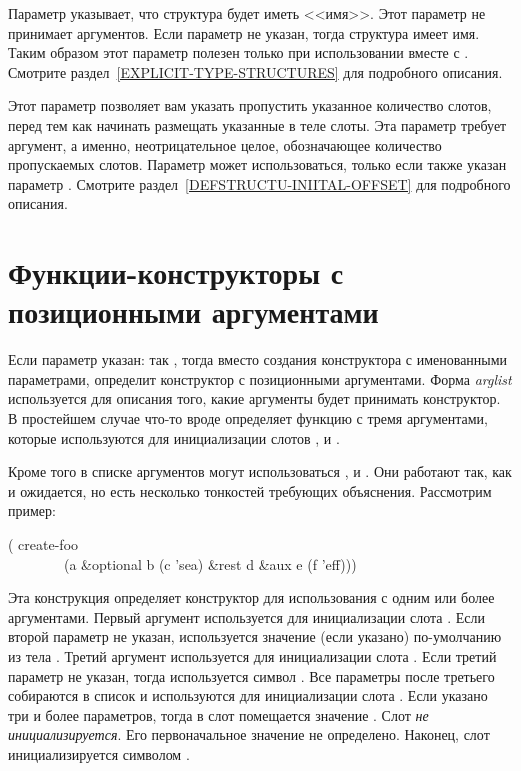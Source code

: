 \begin{flushdesc}
\item[\cd{:named}] Параметр  указывает, что структура будет иметь
  <<имя>>. Этот параметр не принимает аргументов. Если параметр  не
  указан, тогда структура имеет имя. Таким образом этот параметр полезен только
  при использовании вместе с .  Смотрите
  раздел~\ref{EXPLICIT-TYPE-STRUCTURES} для подробного описания.

\item[\cd{:initial-offset}] Этот параметр позволяет вам указать 
  пропустить указанное количество слотов, перед тем как начинать размещать
  указанные в теле слоты. Эта параметр требует аргумент, а именно,
  неотрицательное целое, обозначающее количество пропускаемых слотов. Параметр
   может использоваться, только если также указан параметр
  .  Смотрите раздел~\ref{DEFSTRUCTU-INIITAL-OFFSET} для подробного
  описания.
\end{flushdesc}

\section{Функции-конструкторы с позиционными аргументами}
\label{DEFSTRUCT-CONSTRUCTOR-SYNTAX}

Если параметр  указан: так , тогда вместо создания конструктора с именованными
параметрами,  определит конструктор с позиционными аргументами.
Форма \emph{arglist} используется для описания того, какие аргументы будет
принимать конструктор. В простейшем случае что-то вроде  определяет функцию  с тремя аргументами,
которые используются для инициализации слотов ,  и .

Кроме того в списке аргументов могут использоваться , 
и . Они работают так, как и ожидается, но есть несколько тонкостей
требующих объяснения. Рассмотрим пример:
\begin{lisp}
( create-foo \\
~~~~~~~~(a \&optional b (c 'sea) \&rest d \&aux e (f 'eff)))
\end{lisp}
Эта конструкция определяет конструктор  для использования с
одним или более аргументами. Первый аргумент используется для инициализации
слота . Если второй параметр не указан, используется значение (если
указано) по-умолчанию из тела . Третий аргумент используется для
инициализации слота . Если третий параметр не указан, тогда используется
символ . Все параметры после третьего собираются в список и
используются для инициализации слота . Если указано три и более
параметров, тогда в слот  помещается значение {\false}. Слот 
\emph{не инициализируется}. Его первоначальное значение не определено. Наконец,
слот  инициализируется символом .

